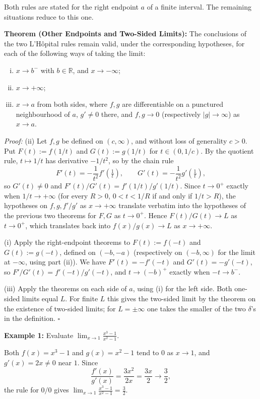 \documentclass[a4paper,11pt,abstracton]{scrartcl}
\newcommand{\RR}{\mathbb{R}}
\theoremstyle{dotlessP}
\theoremstyle{dotlessS}
\theoremstyle{remark}
\theoremstyle{definition}
\begin{document}
Both rules are stated for the right endpoint $a$ of a finite interval. The remaining situations reduce to this one.

\begin{problem_box}
\textbf{Theorem (Other Endpoints and Two-Sided Limits):}
The conclusions of the two L'H\^opital rules remain valid, under the corresponding hypotheses, for each of the following ways of taking the limit:
\begin{enumerate}[(i)]
    \item $x\to b^-$ with $b\in\RR$, and $x\to-\infty$;
    \item $x\to+\infty$;
    \item $x\to a$ from both sides, where $f,g$ are differentiable on a punctured neighbourhood of $a$, $g'\ne0$ there, and $f,g\to0$ (respectively $|g|\to\infty$) as $x\to a$.
\end{enumerate}
\end{problem_box}

\begin{claim_box}
\textit{Proof:}
(ii) Let $f,g$ be defined on $(c,\infty)$, and without loss of generality $c>0$. Put $F(t):=f(1/t)$ and $G(t):=g(1/t)$ for $t\in(0,1/c)$. By the quotient rule, $t\mapsto1/t$ has derivative $-1/t^2$, so by the chain rule
\[
    F'(t)=-\frac1{t^2}f'\!\left(\tfrac1t\right),\qquad G'(t)=-\frac1{t^2}g'\!\left(\tfrac1t\right),
\]
so $G'(t)\ne0$ and $F'(t)/G'(t)=f'(1/t)/g'(1/t)$. Since $t\to0^+$ exactly when $1/t\to+\infty$ (for every $R>0$, $0<t<1/R$ if and only if $1/t>R$), the hypotheses on $f,g,f'/g'$ as $x\to+\infty$ translate verbatim into the hypotheses of the previous two theorems for $F,G$ as $t\to0^+$. Hence $F(t)/G(t)\to L$ as $t\to0^+$, which translates back into $f(x)/g(x)\to L$ as $x\to+\infty$.

(i) Apply the right-endpoint theorems to $F(t):=f(-t)$ and $G(t):=g(-t)$, defined on $(-b,-a)$ (respectively on $(-b,\infty)$ for the limit at $-\infty$, using part (ii)). We have $F'(t)=-f'(-t)$ and $G'(t)=-g'(-t)$, so $F'/G'(t)=f'(-t)/g'(-t)$, and $t\to(-b)^+$ exactly when $-t\to b^-$.

(iii) Apply the theorems on each side of $a$, using (i) for the left side. Both one-sided limits equal $L$. For finite $L$ this gives the two-sided limit by the theorem on the existence of two-sided limits; for $L=\pm\infty$ one takes the smaller of the two $\delta$'s in the definition.
\hfill$\square$
\end{claim_box}

\begin{example_box}
\textbf{Example 1:} Evaluate $\displaystyle\lim_{x\to1}\frac{x^3-1}{x^2-1}$.
\end{example_box}
\begin{example_claim_box}
Both $f(x)=x^3-1$ and $g(x)=x^2-1$ tend to $0$ as $x\to1$, and $g'(x)=2x\ne0$ near $1$. Since
\[
    \frac{f'(x)}{g'(x)}=\frac{3x^2}{2x}=\frac{3x}2\longrightarrow\frac32,
\]
the rule for $0/0$ gives $\displaystyle\lim_{x\to1}\frac{x^3-1}{x^2-1}=\frac32$.
\end{example_claim_box}
\end{document}
